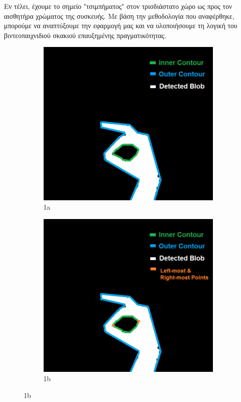 Εν τέλει, έχουμε το σημείο "τσιμπήματος" στον τρισδιάστατο χώρο ως προς τον αισθητήρα χρώματος της συσκευής. Με βάση την μεθοδολογία που αναφέρθηκε, μπορούμε να αναπτύξουμε την εφαρμογή μας και να υλοποιήσουμε τη λογική του βιντεοπαιχνιδιού σκακιού επαυξημένης πραγματικότητας. 




\begin{figure}[H]
\begin{subfigure}{.5\textwidth}
  \centering
  \includegraphics[width=.8\linewidth]{Files/Figures/2.png}
  \caption{1a}
  \label{fig:sfig1}
\end{subfigure}%
\begin{subfigure}{.5\textwidth}
  \centering
  \includegraphics[width=.8\linewidth]{Files/Figures/3.png}
  \caption{1b}

\end{subfigure}
\end{figure}
